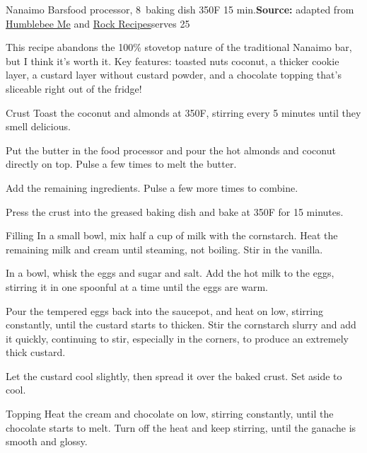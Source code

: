 \begin{recipe}{Nanaimo Bars}{food processor, 8\inch{}\inch\ baking dish \hfill 350\0F \hfill 15 min.}{\textbf{Source:} adapted from \href{https://www.humblebeeandme.com/totally-from-scratch-nanaimo-bars/}{Humblebee \And Me} and \href{https://www.rockrecipes.com/chocolate-mint-nanaimo-bars/}{Rock Recipes}\hfill serves 25}

 \freeform This recipe abandons the 100\% stovetop nature of the traditional Nanaimo bar, but I think it's worth it. Key features: toasted nuts \And coconut, a thicker cookie layer, a custard layer without custard powder, and a chocolate topping that's sliceable right out of the fridge!

\freeform Crust
 Toast the coconut and almonds at 350\0F, stirring every 5 minutes until they smell delicious.

 Put the butter in the food processor and pour the hot almonds and coconut directly on top. Pulse a few times to melt the butter.

 Add the remaining ingredients. Pulse a few more times to combine.

 \newstep Press the crust into the greased baking dish and bake at 350\0F for 15 minutes.

\freeform Filling
 In a small bowl, mix half a cup of milk with the cornstarch. Heat the remaining milk and cream until steaming, not boiling. Stir in the vanilla.

 In a bowl, whisk the eggs and sugar and salt. Add the hot milk to the eggs, stirring it in one spoonful at a time until the eggs are warm.

 \newstep Pour the tempered eggs back into the saucepot, and heat on low, stirring constantly, until the custard starts to thicken. Stir the cornstarch slurry and add it quickly, continuing to stir, especially in the corners, to produce an extremely thick custard.

 \newstep Let the custard cool slightly, then spread it over the baked crust. Set aside to cool.

\freeform Topping
 Heat the cream and chocolate on low, stirring constantly, until the chocolate starts to melt. Turn off the heat and keep stirring, until the ganache is smooth and glossy.


\end{recipe}
